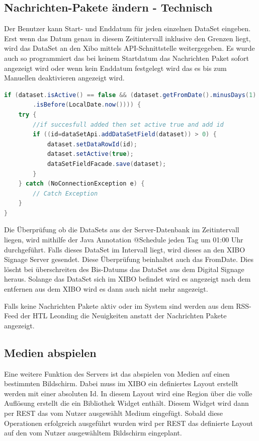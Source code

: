 \subsection{Nachrichten-Pakete ändern - Technisch}\label{sec:datasetexpiredate}
Der Benutzer kann Start- und Enddatum für jeden einzelnen DataSet eingeben. Erst wenn das Datum genau in diesem Zeitintervall inklusive den Grenzen liegt, wird das DataSet an den Xibo mittels API-Schnittstelle weitergegeben. Es wurde auch so programmiert das bei keinem Startdatum das Nachrichten Paket sofort angezeigt wird oder wenn kein Enddatum festgelegt wird das es bis zum Manuellen deaktivieren angezeigt wird.

\begin{lstlisting}[language=Java, caption={public void doCheckEvery24Hours()}]
if (dataset.isActive() == false && (dataset.getFromDate().minusDays(1)
        .isBefore(LocalDate.now()))) {
    try {
        //if succesfull added then set active true and add id
        if ((id=dataSetApi.addDataSetField(dataset)) > 0) {
            dataset.setDataRowId(id);
            dataset.setActive(true);
            dataSetFieldFacade.save(dataset);
        }
    } catch (NoConnectionException e) {
        // Catch Exception
    }
}
\end{lstlisting}

Die Überprüfung ob die DataSets aus der Server-Datenbank im Zeitintervall liegen, wird mithilfe der Java Annotation @Schedule jeden Tag um 01:00 Uhr durchgeführt. Falls dieses DataSet im Intervall liegt, wird dieses an den XIBO Signage Server gesendet. Diese Überprüfung beinhaltet auch das FromDate. Dies löscht bei überschreiten des Bis-Datums das DataSet aus dem Digital Signage heraus. Solange das DataSet sich im XIBO befindet wird es angezeigt nach dem entfernen aus dem XIBO wird es dann auch nicht mehr angezeigt.

Falls keine Nachrichten Pakete aktiv oder im System sind werden aus dem RSS-Feed der HTL Leonding die Neuigkeiten anstatt der Nachrichten Pakete angezeigt.

\subsection{Medien abspielen}\label{sec:playmedia}
Eine weitere Funktion des Servers ist das abspielen von Medien auf einen bestimmten Bildschirm. Dabei muss im XIBO ein definiertes Layout erstellt werden mit einer absoluten Id. In diesem Layout wird eine Region über die volle Auflösung erstellt die ein Bibliothek Widget enthält. Diesem Widget wird dann per REST das vom Nutzer ausgewählt Medium eingefügt. Sobald diese Operationen erfolgreich ausgeführt wurden wird per REST das definierte Layout auf den vom Nutzer ausgewähltem Bildschirm eingeplant.

